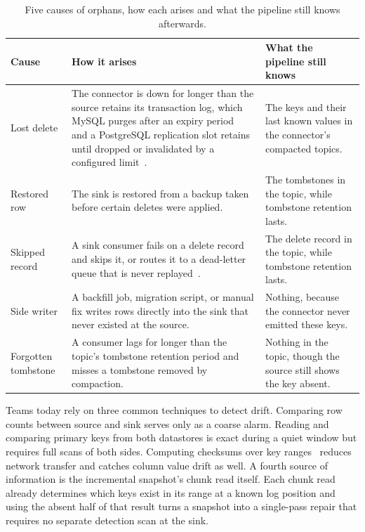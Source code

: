 \documentclass[sigconf,nonacm,10pt]{acmart}
\begin{document}
\begin{table}[t]
\caption{Five causes of orphans, how each arises and what the pipeline still knows afterwards.}
\label{tab:kinds}
\footnotesize
\begin{tabularx}{\textwidth}{@{}>{\RaggedRight}p{1.2in}YY@{}}
\toprule
Cause & How it arises & What the pipeline still knows \\
\midrule
Lost delete & The connector is down for longer than the source retains its
transaction log, which MySQL purges after an expiry
period~\cite{mysql_binlog_expire} and a PostgreSQL replication slot retains
until dropped or invalidated by a configured limit~\cite{postgres_replication_slots}. & The keys and their last known values
in the connector's compacted topics. \\
Restored row & The sink is restored from a backup taken before certain deletes
were applied. & The tombstones in the topic, while tombstone retention lasts. \\
Skipped record & A sink consumer fails on a delete record and skips it, or
routes it to a dead-letter queue that is never
replayed~\cite{kafka_connect_configs}. & The delete record in the topic, while
tombstone retention lasts. \\
Side writer & A backfill job, migration script, or manual fix writes rows
directly into the sink that never existed at the source. & Nothing, because the
connector never emitted these keys. \\
Forgotten tombstone & A consumer lags for longer than the topic's tombstone
retention period and misses a tombstone removed by compaction. & Nothing in the
topic, though the source still shows the key absent. \\
\bottomrule
\end{tabularx}
\end{table}

Teams today rely on three common techniques to detect drift. Comparing row
counts between source and sink serves only as a coarse alarm. Reading and
comparing primary keys from both datastores is exact during a quiet window but
requires full scans of both sides. Computing checksums over key
ranges~\cite{percona_pt_table_checksum} reduces network transfer and catches column value drift as well. 
A fourth source of
information is the incremental snapshot's chunk read itself. Each chunk read
already determines which keys exist in its range at a known log position and using
the absent half of that result turns a snapshot into a single-pass repair that
requires no separate detection scan at the sink.
\end{document}
